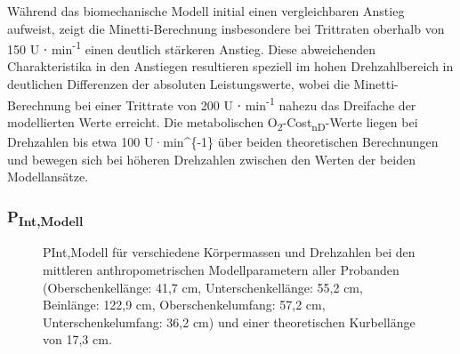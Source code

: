 \documentclass[
  letterpaper,
  DIV=11]{scrartcl}
\begin{document}
Während das biomechanische Modell initial einen vergleichbaren Anstieg
aufweist, zeigt die Minetti-Berechnung insbesondere bei Trittraten
oberhalb von 150 U ⋅ min\textsuperscript{-1} einen deutlich stärkeren
Anstieg. Diese abweichenden Charakteristika in den Anstiegen resultieren
speziell im hohen Drehzahlbereich in deutlichen Differenzen der
absoluten Leistungswerte, wobei die Minetti-Berechnung bei einer
Trittrate von 200 U ⋅ min\textsuperscript{-1} nahezu das Dreifache der
modellierten Werte erreicht. Die metabolischen
O\textsubscript{2}-Cost\textsubscript{nD}-Werte liegen bei Drehzahlen
bis etwa 100 U·min\^{}\{-1\} über beiden theoretischen Berechnungen und
bewegen sich bei höheren Drehzahlen zwischen den Werten der beiden
Modellansätze.

\subsubsection{\texorpdfstring{P\textsubscript{Int,Modell}}{PInt,Modell}}

\begin{figure}


\caption{\label{fig-PInt_Modell}PInt,Modell für verschiedene
Körpermassen und Drehzahlen bei den mittleren anthropometrischen
Modellparametern aller Probanden (Oberschenkellänge: 41,7 cm,
Unterschenkellänge: 55,2 cm, Beinlänge: 122,9 cm, Oberschenkelumfang:
57,2 cm, Unterschenkelumfang: 36,2 cm) und einer theoretischen
Kurbellänge von 17,3 cm.}

\end{figure}%
\end{document}
